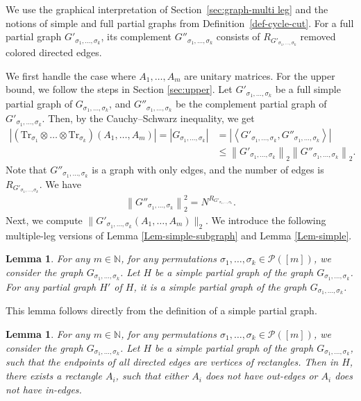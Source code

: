 \documentclass[12pt]{article}
\numberwithin{equation}{section}
\theoremstyle{plain}
\newtheorem{lemma}[theorem]{Lemma}
\def\bN{\mathbb N}
\def\cP{\mathcal P}
\def\Tr{\mathrm {Tr}}
\begin{document}
We use the graphical interpretation of Section~\ref{sec:graph-multi leg} and the notions of simple and full partial graphs from Definition~\ref{def-cycle-cut}. For a full partial graph $G'_{\sigma_1,\ldots,\sigma_k}$, its complement $G''_{\sigma_1,\ldots,\sigma_k}$ consists of $R_{G'_{\sigma_1,\ldots,\sigma_k}}$ removed colored directed edges.

We first handle the case where $A_1,\ldots,A_m$ are unitary matrices.
For the upper bound, we follow the steps in Section \ref{sec:upper}.
Let $G'_{\sigma_1,\ldots,\sigma_k}$ be a full simple partial graph of $G_{\sigma_1,\ldots,\sigma_k}$, and $G''_{\sigma_1,\ldots,\sigma_k}$ be the complement partial graph of $G'_{\sigma_1,\ldots,\sigma_k}$.
Then, by the Cauchy--Schwarz inequality, we get
\begin{align} \label{ineq-G-multi-1}
    \left| \left( \Tr_{\sigma_1} \otimes \ldots \otimes \Tr_{\sigma_k} \right) \left( A_1, \ldots, A_m \right) \right|
    = \left| G_{\sigma_1,\ldots,\sigma_k} \right|
    &= \left| \left\langle G'_{\sigma_1,\ldots,\sigma_k}, G''_{\sigma_1,\ldots,\sigma_k} \right\rangle \right| \nonumber \\
    &\le \left\|G'_{\sigma_1,\ldots,\sigma_k} \right\|_2 \left\| G''_{\sigma_1,\ldots,\sigma_k} \right\|_2.
\end{align}
Note that $G''_{\sigma_1,\ldots,\sigma_k}$ is a graph with only edges, and the number of edges is $R_{G'_{\sigma_1,\ldots,\sigma_k}}$. We have
\begin{align} \label{eq-G''-multi}
    \left\| G''_{\sigma_1,\ldots,\sigma_k} \right\|_2^2 = N^{R_{G'_{\sigma_1,\ldots,\sigma_k}}}.
\end{align}
Next, we compute $\|G'_{\sigma_1,\ldots,\sigma_k} (A_1,\ldots,A_m)\|_2$. We introduce the following multiple-leg versions of Lemma \ref{Lem-simple-subgraph} and Lemma \ref{Lem-simple}.

\begin{lemma} \label{Lem-multi-simple-subgraph}
For any $m \in \bN$, for any permutations $\sigma_1,\ldots,\sigma_k \in \cP([m])$, we consider the graph $G_{\sigma_1,\ldots,\sigma_k}$. Let $H$ be a simple partial graph of the graph $G_{\sigma_1,\ldots,\sigma_k}$. For any partial graph $H'$ of $H$, it is a simple partial graph of the graph $G_{\sigma_1,\ldots,\sigma_k}$.
\end{lemma}

This lemma follows directly from the definition of a simple partial graph.

\begin{lemma} \label{Lem-multi-simple}
For any $m \in \bN$, for any permutations $\sigma_1,\ldots,\sigma_k \in \cP([m])$, we consider the graph $G_{\sigma_1,\ldots,\sigma_k}$. Let $H$ be a simple partial graph of the graph $G_{\sigma_1,\ldots,\sigma_k}$, such that the endpoints of all directed edges are vertices of rectangles. Then in $H$, there exists a rectangle $A_i$, such that either $A_i$ does not have out-edges or $A_i$ does not have in-edges.
\end{lemma}
\end{document}
